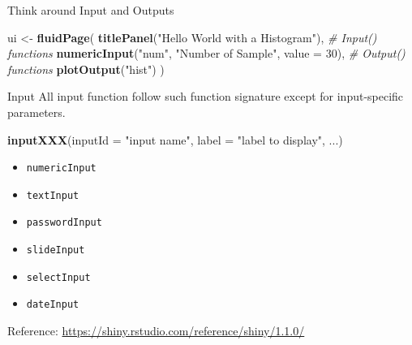 \documentclass[
  10pt,
  ignorenonframetext,
  serif]{beamer}
\newenvironment{Shaded}{\begin{snugshade}}{\end{snugshade}}
\newcommand{\CommentTok}[1]{\textcolor[rgb]{0.56,0.35,0.01}{\textit{#1}}}
\newcommand{\DataTypeTok}[1]{\textcolor[rgb]{0.13,0.29,0.53}{#1}}
\newcommand{\DecValTok}[1]{\textcolor[rgb]{0.00,0.00,0.81}{#1}}
\newcommand{\KeywordTok}[1]{\textcolor[rgb]{0.13,0.29,0.53}{\textbf{#1}}}
\newcommand{\NormalTok}[1]{#1}
\newcommand{\StringTok}[1]{\textcolor[rgb]{0.31,0.60,0.02}{#1}}
\providecommand{\tightlist}{%
  \setlength{\itemsep}{0pt}\setlength{\parskip}{0pt}}
\begin{document}
\begin{frame}[fragile]{Think around Input and Outputs}
\protect\hypertarget{think-around-input-and-outputs}{}
\begin{Shaded}
\begin{Highlighting}[]
\NormalTok{ui \textless{}{-}}\StringTok{ }\KeywordTok{fluidPage}\NormalTok{(}
  \KeywordTok{titlePanel}\NormalTok{(}\StringTok{"Hello World with a Histogram"}\NormalTok{),}
  \CommentTok{\# Input() functions}
  \KeywordTok{numericInput}\NormalTok{(}\StringTok{"num"}\NormalTok{, }\StringTok{"Number of Sample"}\NormalTok{, }\DataTypeTok{value =} \DecValTok{30}\NormalTok{),}
  \CommentTok{\# Output() functions}
  \KeywordTok{plotOutput}\NormalTok{(}\StringTok{"hist"}\NormalTok{)}
\NormalTok{)}
\end{Highlighting}
\end{Shaded}
\end{frame}

\begin{frame}[fragile]{Input}
\protect\hypertarget{input}{}
All input function follow such function signature except for
input-specific parameters.

\begin{Shaded}
\begin{Highlighting}[]
\KeywordTok{inputXXX}\NormalTok{(}\DataTypeTok{inputId =} \StringTok{"input name"}\NormalTok{, }\DataTypeTok{label =} \StringTok{"label to display"}\NormalTok{, ...)}
\end{Highlighting}
\end{Shaded}

\begin{itemize}
\tightlist
\item
  \texttt{numericInput}
\item
  \texttt{textInput}
\item
  \texttt{passwordInput}
\item
  \texttt{slideInput}
\item
  \texttt{selectInput}
\item
  \texttt{dateInput}
\end{itemize}

Reference: \url{https://shiny.rstudio.com/reference/shiny/1.1.0/}
\end{frame}
\end{document}
